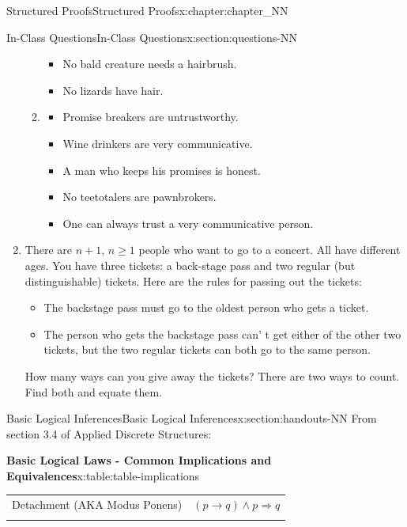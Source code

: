 \documentclass[oneside,10pt,]{book}
\newcommand{\tabularfont}{\relax}
\numberwithin{equation}{section}
\newcommand{\hrulemedium}{\noalign{\hrule height 0.07em}}
\begin{document}
\begin{chapterptx}{Structured Proofs}{}{Structured Proofs}{}{}{x:chapter:chapter_NN}
\begin{sectionptx}{In-Class Questions}{}{In-Class Questions}{}{}{x:section:questions-NN}
\begin{enumerate}[label=\arabic*.]
\begin{enumerate}[label=(\alph*)]
\begin{itemize}[label=\textbullet]
\item{}No bald creature needs a hairbrush.%
\item{}No lizards have hair.%
\end{itemize}
%
\item{}%
\begin{itemize}[label=\textbullet]
\item{}Promise breakers are untrustworthy.%
\item{}Wine drinkers are very communicative.%
\item{}A man who keeps his promises is honest.%
\item{}No teetotalers are pawnbrokers.%
\item{}One can always trust a very communicative person.%
\end{itemize}
%
\end{enumerate}
%
\item{}There are \(n+1\), \(n\ge 1\) people who want to go to a concert.  All have different ages. You have three tickets: a back-stage pass and two regular (but distinguishable) tickets. Here are the rules for passing out the tickets:%
\begin{itemize}[label=\textbullet]
\item{}The backstage pass must go to the oldest person who gets a ticket.%
\item{}The person who gets the backstage pass can' t get either of the other two tickets, but the two regular tickets can both go to the same person.%
\end{itemize}
How many ways can you give away the tickets? There are two ways to count. Find both and equate them.%
\end{enumerate}
%
\end{sectionptx}
%
%
\typeout{************************************************}
\typeout{************************************************}
%
\begin{sectionptx}{Basic Logical Inferences}{}{Basic Logical Inferences}{}{}{x:section:handouts-NN}
From section 3.4 of Applied Discrete Structures:%
\begin{tableptx}{\textbf{Basic Logical Laws - Common Implications and Equivalences}}{x:table:table-implications}{}%
\centering
{}%
%
%
%
{\tabularfont%
\begin{tabular}{cc}
Detachment (AKA Modus Ponens)&\((p \rightarrow  q) \land  p\Rightarrow  q\)\tabularnewline\hrulemedium

\end{tabular}}
\end{tableptx}
\end{sectionptx}
\end{chapterptx}
\end{document}
